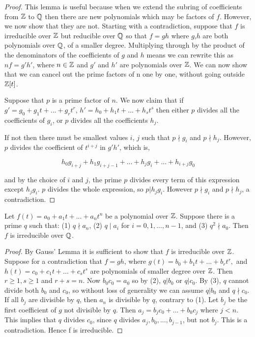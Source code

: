 \begin{proof}
This lemma is useful because when we extend the subring of coefficients from $\mathbb Z$ to $\mathbb Q$ then there are new polynomials which may be factors of $f$. However, we now show that they are not. Starting with a contradiction, suppose that $f$ is irreducible over $\mathbb Z$ but reducible over $\mathbb Q$ so that $f = g h$ where $g$,$h$ are both polynomials over $\mathbb Q$, of a smaller degree. Multiplying through by the product of the denominators of the coefficients of $g$ and $h$ means we can rewrite this as $n f = g' h'$, where $n \in \mathbb Z$ and $g'$ and $h'$ are polynomials over $\mathbb Z$. We can now show that we can cancel out the prime factors of n one by one, without going outside $\mathbb Z[t]$.

Suppose that $p$ is a prime factor of $n$. We now claim that if $g' = g_0 + g_1 t +...+ g_r t^r$, $h' = h_0 + h_1 t +...+ h_s t^s$ then either $p$ divides all the coefficients of $g_i$, or $p$ divides all the coefficients $h_j$.

If not then there must be smallest values $i$, $j$ such that $p \nmid g_i$ and $p \nmid h_j$. However, $p$ divides the coefficient of $t^{i+j}$ in $g' h'$, which is, 

$$
h_0 g_{i+j} + h_1 g_{i+j-1} +...+ h_j g_i +...+ h_{i+j} g_0
$$

and by the choice of $i$ and $j$, the prime $p$ divides every term of this expression except $h_j g_i$. $p$ divides the whole expression, so $p | h_j g_i$. However $p \nmid g_i$ and $p \nmid h_j$, a contradiction.
\end{proof}

\begin{theorem} \label{thm:eisenstein}
     Let
    $f(t) = a_0 + a_1 t + ... + a_n t^n$
    be a polynomial over $\mathbb Z$. Suppose there is a prime $q$ such that: (1) $q \nmid a_n$, (2) $q \mid a_i$ for $i = {0, 1,..., n-1}$, and (3) $q^2 \nmid a_0$. Then $f$ is irreducible over $\mathbb Q$. 
\end{theorem}

\begin{proof}
By Gauss' Lemma it is sufficient to show that $f$ is irreducible over $\mathbb Z$. Suppose for a contradiction that $f = gh$, where
$
g(t)=b_0+b_1 t+ ... +b_r t^r,
$
and
$
h(t)=c_0+c_1 t+ ... +c_s t^s
$
are polynomials of smaller degree over $\mathbb Z$. Then $r \ge 1, s \ge 1$ and $r+s = n$. Now $b_0 c_0 = a_0$ so by (2), $q | b_0$ or $q|c_0$. By (3), $q$ cannot divide both $b_0$ and $c_0$, so without
loss of generality we can assume $q | b_0$ and $q \nmid c_0$. If all $b_j$ are divisible by $q$, then $a_n$ is divisible by $q$, contrary to (1). Let $b_j$ be the first coefficient of $g$ not divisible by $q$. Then
$
a_j = b_j c_0 + ...+ b_0 c_j
$
where $j < n$. This implies that $q$ divides $c_0$, since $q$ divides $a_j, b_0,..., b_{j-1}$, but not $b_j$. This is a contradiction. Hence f is irreducible.
\end{proof}

